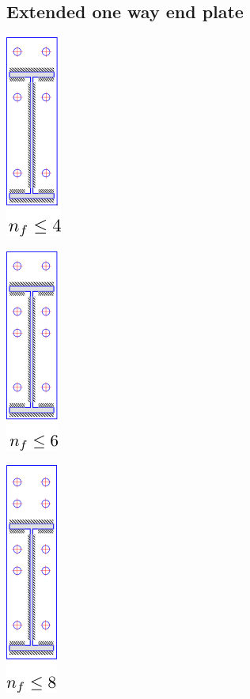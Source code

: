 \documentclass[11.5pt,a4paper,oneside]{report}
\begin{document}
\begin{Form}
\subsection{Extended one way end plate}
	\begin{multicols}{3}
		\begin{center}
			\includegraphics{bolt_layout3.png}
		\end{center}
		\begin{center}
			\includegraphics{bolt_layout4.png}
		\end{center}
		\begin{center}
			\includegraphics{bolt_layout5.png}
		\end{center}
	\end{multicols}


\end{Form}
\end{document}
